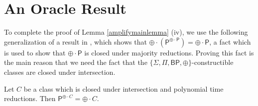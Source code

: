 \documentclass[11pt]{article}
\newcommand{\bp}{\textsf{BP}}
\newcommand{\parity}{\oplus}
\newcommand{\p}{\textsf{P}}
\begin{document}
\section{An Oracle Result}\label{oracle}

To complete the proof of Lemma \ref{amplifymainlemma} (iv), we use the following generalization of a result in \cite{Toda}, which shows that $\parity \cdot (\p ^{\parity\cdot\p}) = \parity\cdot\p$, a fact which is used to show that $\parity \cdot \p$ is closed under majority reductions. Proving this fact is the main reason that we need the fact that the $\{\Sigma, \Pi, \bp, \parity\}$-constructible classes are closed under intersection.

\begin{theorem}\label{oracleparityc}
Let $C$ be a class which is closed under intersection and polynomial time reductions. Then \emph{$ \p^{\parity \cdot C} = \parity \cdot C$}.
\end{theorem}
\end{document}
